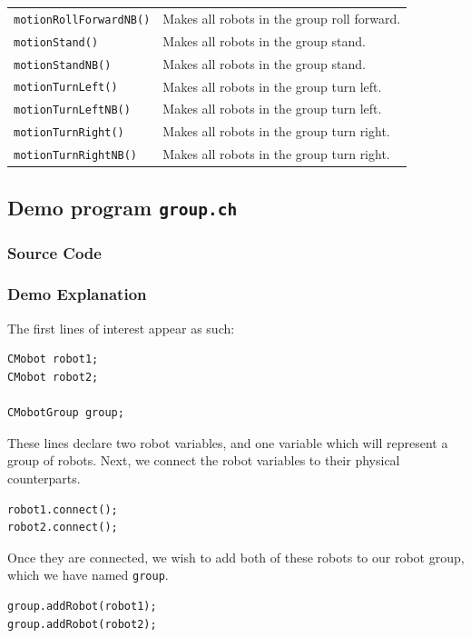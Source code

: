 \documentclass{article}
\begin{document}
\begin{tabular}{p{4.5cm}p{8cm}}
\texttt{motionRollForwardNB()} & Makes all robots in the group roll forward. \\
\texttt{motionStand()} & Makes all robots in the group stand. \\
\texttt{motionStandNB()} & Makes all robots in the group stand. \\
\texttt{motionTurnLeft()} & Makes all robots in the group turn left. \\
\texttt{motionTurnLeftNB()} & Makes all robots in the group turn left. \\
\texttt{motionTurnRight()} & Makes all robots in the group turn right. \\
\texttt{motionTurnRightNB()} & Makes all robots in the group turn right.\\
\hline
\end{tabular}

\subsection{Demo program \texttt{group.ch}}
\subsubsection{Source Code}


\subsubsection{Demo Explanation}
The first lines of interest appear as such:

\begin{verbatim}
CMobot robot1;
CMobot robot2;

CMobotGroup group;
\end{verbatim}

These lines declare two robot variables, and one variable which
will represent a group of robots. Next, we connect the robot
variables to their physical counterparts.

\begin{verbatim}
robot1.connect();
robot2.connect();
\end{verbatim}

Once they are connected, we wish to add both of these robots to our robot group,
which we have named \texttt{group}.

\begin{verbatim}
group.addRobot(robot1);
group.addRobot(robot2);
\end{verbatim}
\end{document}
